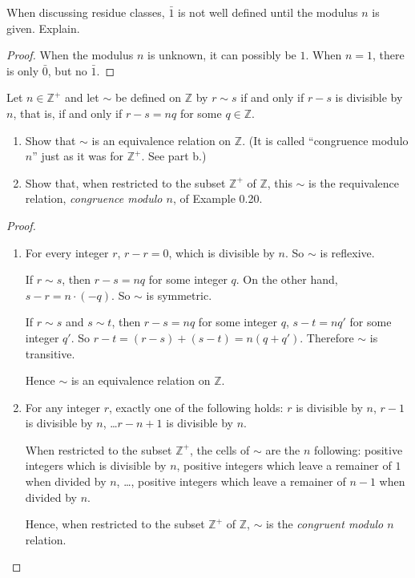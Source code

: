 \newpage
\begin{exercise}
    When discussing residue classes, $\bar{1}$ is not well defined until the modulus $n$ is given. Explain.
\end{exercise}

\begin{proof}
    When the modulus $n$ is unknown, it can possibly be $1$. When $n = 1$, there is only $\bar{0}$, but no $\bar{1}$.
\end{proof}

\newpage
\begin{exercise}
    Let $n\in\mathbb{Z}^{+}$ and let $\sim$ be defined on $\mathbb{Z}$ by $r\sim s$ if and only if $r - s$ is divisible by $n$, that is, if and only if $r - s = nq$ for some $q\in\mathbb{Z}$.
    \begin{enumerate}[label={\textbf{\alph*.}},itemsep=0pt]
        \item Show that $\sim$ is an equivalence relation on $\mathbb{Z}$. (It is called ``congruence modulo $n$'' just as it was for $\mathbb{Z}^{+}$. See part b.)
        \item Show that, when restricted to the subset $\mathbb{Z}^{+}$ of $\mathbb{Z}$, this $\sim$ is the requivalence relation, \textit{congruence modulo $n$}, of Example 0.20.
    \end{enumerate}
\end{exercise}

\begin{proof}
    \begin{enumerate}
        \item For every integer $r$, $r - r = 0$, which is divisible by $n$. So $\sim$ is reflexive.

              If $r\sim s$, then $r - s = nq$ for some integer $q$. On the other hand, $s - r = n\cdot (-q)$. So $\sim$ is symmetric.

              If $r\sim s$ and $s\sim t$, then $r - s = nq$ for some integer $q$, $s - t = nq'$ for some integer $q'$. So $r - t = (r - s) + (s - t) = n(q + q')$. Therefore $\sim$ is transitive.

              Hence $\sim$ is an equivalence relation on $\mathbb{Z}$.
        \item For any integer $r$, exactly one of the following holds: $r$ is divisible by $n$, $r - 1$ is divisible by $n$, \ldots $r - n + 1$ is divisible by $n$.

              When restricted to the subset $\mathbb{Z}^{+}$, the cells of $\sim$ are the $n$ following: positive integers which is divisible by $n$, positive integers which leave a remainer of $1$ when divided by $n$, \ldots, positive integers which leave a remainer of $n-1$ when divided by $n$.

              Hence, when restricted to the subset $\mathbb{Z}^{+}$ of $\mathbb{Z}$, $\sim$ is the \textit{congruent modulo $n$} relation.
    \end{enumerate}
\end{proof}

